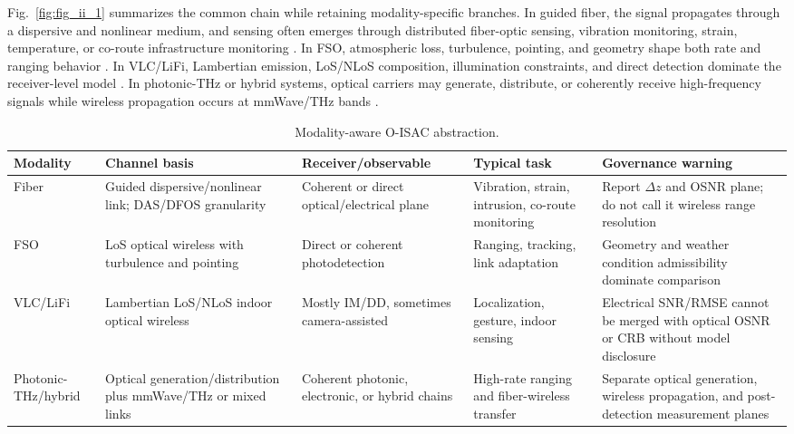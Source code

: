 \documentclass[letterpaper,journal]{IEEEtran}
\begin{document}
Fig.~\ref{fig:fig_ii_1} summarizes the common chain while retaining modality-specific branches. In guided fiber, the signal propagates through a dispersive and nonlinear medium, and sensing often emerges through distributed fiber-optic sensing, vibration monitoring, strain, temperature, or co-route infrastructure monitoring \cite{O_ISAC_006,O_ISAC_013,O_ISAC_024,O_ISAC_032,O_ISAC_046,O_ISAC_076}. In FSO, atmospheric loss, turbulence, pointing, and geometry shape both rate and ranging behavior \cite{O_ISAC_005,O_ISAC_023,O_ISAC_035,O_ISAC_048}. In VLC/LiFi, Lambertian emission, LoS/NLoS composition, illumination constraints, and direct detection dominate the receiver-level model \cite{O_ISAC_009,O_ISAC_022,O_ISAC_039,O_ISAC_054}. In photonic-THz or hybrid systems, optical carriers may generate, distribute, or coherently receive high-frequency signals while wireless propagation occurs at mmWave/THz bands \cite{O_ISAC_026,O_ISAC_029,O_ISAC_047,O_ISAC_065,O_ISAC_070,O_ISAC_077}.

\begin{table}[!t]
    \caption{Modality-aware O-ISAC abstraction.}
    \label{tab:ii1}
    \centering
    \scriptsize
    \setlength{\tabcolsep}{2.7pt}
    \renewcommand{\arraystretch}{1.08}
    \begin{tabularx}{\textwidth}{@{}p{1.65cm}p{2.05cm}p{2.15cm}p{2.0cm}X@{}}
        \toprule
        Modality & Channel basis & Receiver/observable & Typical task & Governance warning \\
        \midrule
        Fiber & Guided dispersive/nonlinear link; DAS/DFOS granularity & Coherent or direct optical/electrical plane & Vibration, strain, intrusion, co-route monitoring & Report $\Delta z$ and OSNR plane; do not call it wireless range resolution \\
        FSO & LoS optical wireless with turbulence and pointing & Direct or coherent photodetection & Ranging, tracking, link adaptation & Geometry and weather condition admissibility dominate comparison \\
        VLC/LiFi & Lambertian LoS/NLoS indoor optical wireless & Mostly IM/DD, sometimes camera-assisted & Localization, gesture, indoor sensing & Electrical SNR/RMSE cannot be merged with optical OSNR or CRB without model disclosure \\
        Photonic-THz/hybrid & Optical generation/distribution plus mmWave/THz or mixed links & Coherent photonic, electronic, or hybrid chains & High-rate ranging and fiber-wireless transfer & Separate optical generation, wireless propagation, and post-detection measurement planes \\
        \bottomrule
    \end{tabularx}
\end{table}
\end{document}
